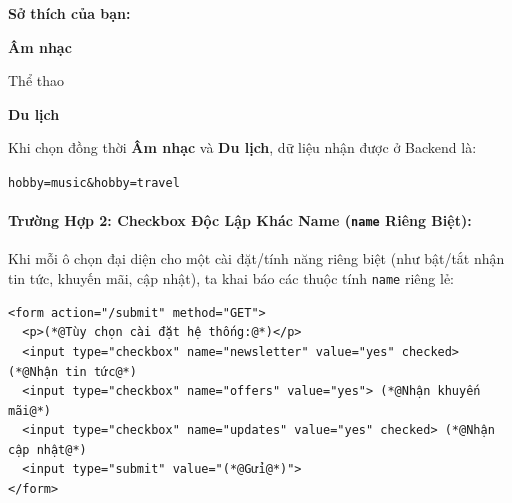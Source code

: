 \documentclass[11pt,oneside]{book}
\newcommand{\codeinline}[1]{\textcolor{accentOrange}{\texttt{#1}}}
\begin{document}
\begin{browserWindow}[Mô Phỏng Trình Duyệt: Gom Nhóm Checkbox Chung name="hobby"]
\sffamily\small
\textbf{Sở thích của bạn:} \\[6pt]
 \; \textbf{Âm nhạc} \quad
{} \; Thể thao \quad
{} \; \textbf{Du lịch} \\[8pt]
\end{browserWindow}

\begin{tipBox}
Khi chọn đồng thời \textbf{Âm nhạc} và \textbf{Du lịch}, dữ liệu nhận được ở Backend là:
\begin{center}
\codeinline{hobby=music\&hobby=travel}
\end{center}
\end{tipBox}

\paragraph{Trường Hợp 2: Checkbox Độc Lập Khác Name (\codeinline{name} Riêng Biệt):}

Khi mỗi ô chọn đại diện cho một cài đặt/tính năng riêng biệt (như bật/tắt nhận tin tức, khuyến mãi, cập nhật), ta khai báo các thuộc tính \codeinline{name} riêng lẻ:

\begin{codeWindow}
\begin{lstlisting}[language=HTML5]
<form action="/submit" method="GET">
  <p>(*@Tùy chọn cài đặt hệ thống:@*)</p>
  <input type="checkbox" name="newsletter" value="yes" checked> (*@Nhận tin tức@*)
  <input type="checkbox" name="offers" value="yes"> (*@Nhận khuyến mãi@*)
  <input type="checkbox" name="updates" value="yes" checked> (*@Nhận cập nhật@*)
  <input type="submit" value="(*@Gửi@*)">
</form>
\end{lstlisting}
\end{codeWindow}
\end{document}
